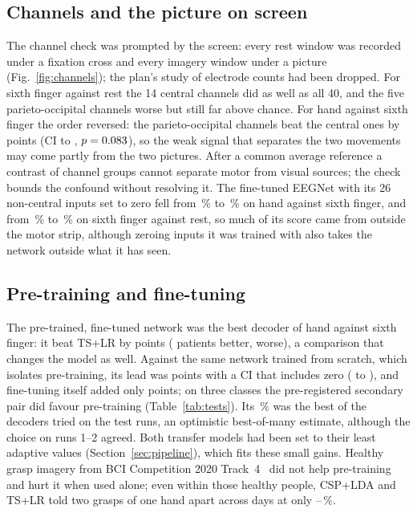 \subsection{Channels and the picture on screen}
\label{sec:abl-channels}
The channel check was prompted by the screen: every rest window was recorded under a fixation
cross and every imagery window under a picture (Fig.~\ref{fig:channels}); the plan's study of
electrode counts had been dropped. For sixth finger against rest the 14 central channels did as
well as all 40, and the five parieto-occipital channels worse but still far above chance. For hand
against sixth finger the order reversed: the parieto-occipital channels beat the central ones by
\rqFourCueAhSfParietoOccipitalVsCentralDiff{} points (CI
\rqFourCueAhSfParietoOccipitalVsCentralDiffCiLo{} to
\rqFourCueAhSfParietoOccipitalVsCentralDiffCiHi, $p = 0.083$),
so the weak signal that separates the two movements may come partly from the two pictures. After a
common average reference a contrast of channel groups cannot separate motor from visual sources;
the check bounds the confound without resolving it. The fine-tuned EEGNet with its 26 non-central
inputs set to zero fell from \exOneArmBVsTsLrArmMean\,\% to \exOneArmBVsTsLrCentralArmMean\,\% on
hand against sixth finger, and from \exFourEegnetEaFtMean\,\% to \exFourEegnetEaFtCentralMean\,\%
on sixth finger against rest, so much of its score came from outside the motor strip, although
zeroing inputs it was trained with also takes the network outside what it has seen.

\subsection{Pre-training and fine-tuning}
The pre-trained, fine-tuned network was the best decoder of hand against sixth finger: it beat
TS+LR by \exOneArmBVsTsLrDiff{} points (\exOneArmBVsTsLrBetter{} patients better,
\exOneArmBVsTsLrWorse{} worse), a comparison that changes the model as well. Against the same
network trained from scratch, which isolates pre-training, its lead was
\exOneArmBVsEegnetScratchDiff{} points with a CI that includes zero
(\exOneArmBVsEegnetScratchDiffCiLo{} to \exOneArmBVsEegnetScratchDiffCiHi), and fine-tuning
itself added only \exOneArmBVsArmBPretrainedDiff{} points; on three classes the pre-registered
secondary pair did favour pre-training (Table~\ref{tab:tests}). Its \exOneArmBVsTsLrArmMean\,\% was the best of the
decoders tried on the test runs, an optimistic best-of-many estimate, although the choice on runs
1--2 agreed. Both transfer models had been set to their least adaptive values
(Section~\ref{sec:pipeline}), which fits these small gains. Healthy grasp imagery from BCI
Competition 2020 Track~4~\cite{jeong2022bcicomp} did not help pre-training and hurt it when used
alone; even within those healthy people, CSP+LDA and TS+LR told two grasps of one hand apart
across days at only \exThreeBenchPairsMin--\exThreeBenchPairsMax\,\%.

